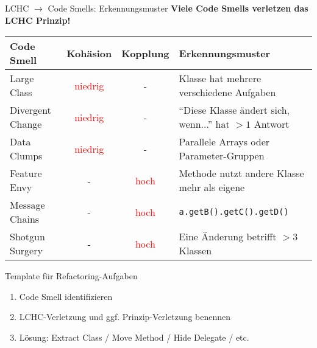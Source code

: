 \begin{frame}{LCHC $\rightarrow$ Code Smells: Erkennungsmuster}
  \textbf{Viele Code Smells verletzen das LCHC Prinzip!}

  {\small
  \begin{tabular}{|l|c|c|l|}
    \hline
    \textbf{Code Smell} & \textbf{Kohäsion} & \textbf{Kopplung} & \textbf{Erkennungsmuster} \\
    \hline
    Large Class & \textcolor{red}{niedrig} & - & Klasse hat mehrere verschiedene Aufgaben \\
    \hline
    Divergent Change & \textcolor{red}{niedrig} & - & ``Diese Klasse ändert sich, wenn...'' hat $>1$ Antwort \\
    \hline
    Data Clumps & \textcolor{red}{niedrig} & - & Parallele Arrays oder Parameter-Gruppen \\
    \hline
    Feature Envy & - & \textcolor{red}{hoch} & Methode nutzt andere Klasse mehr als eigene \\
    \hline
    Message Chains & - & \textcolor{red}{hoch} & \texttt{a.getB().getC().getD()} \\
    \hline
    Shotgun Surgery & - & \textcolor{red}{hoch} & Eine Änderung betrifft $>3$ Klassen \\
    \hline
  \end{tabular}
  }

  \begin{exampleblock}{Template für Refactoring-Aufgaben}
    \begin{enumerate}
      \item Code Smell identifizieren
      \item LCHC-Verletzung und ggf. Prinzip-Verletzung benennen
      \item Lösung: Extract Class / Move Method / Hide Delegate / etc.
    \end{enumerate}
  \end{exampleblock}
\end{frame}

